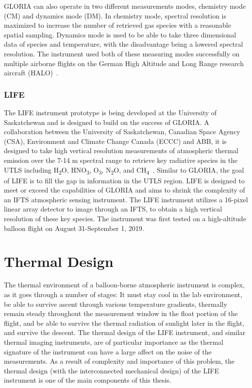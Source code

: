 GLORIA can also operate in two different measurements modes, chemistry mode (CM) and dynamics mode (DM). In chemistry mode, spectral resolution is maximized to increase the number of retrieved gas species with a reasonable spatial sampling. Dynamics mode is used to be able to take three dimensional data of species and temperature, with the disadvantage being a lowered spectral resolution. The instrument used both of these measuring modes successfully on multiple airborne flights on the German High Altitude and Long Range research aircraft (HALO)~\citep{GLORIA_concept}. 

\subsubsection{LIFE} %
The LIFE instrument prototype is being developed at the University of Saskatchewan and is designed to build on the success of GLORIA.  A collaboration between the University of Saskatchewan, Canadian Space Agency (CSA), Environment and Climate Change Canada (ECCC) and ABB, it is designed to take high vertical resolution measurements of atmospheric thermal emission over the 7-14 \textmu m spectral range to retrieve key radiative species in the UTLS including H\textsubscript{2}O, HNO\textsubscript{3}, O\textsubscript{3}, N\textsubscript{2}O, and CH\textsubscript{4}~\citep{ethans_thesis}. Similar to GLORIA, the goal of LIFE is to fill the gap in information in the UTLS region. LIFE is designed to meet or exceed the capabilities of GLORIA and aims to shrink the complexity of an IFTS atmospheric sensing instrument. The LIFE instrument utilizes a 16-pixel linear array detector to image through an IFTS, to obtain a high vertical resolution of these key species. The instrument was first tested on a high-altitude balloon flight on August 31-September 1, 2019.

\section{Thermal Design}
The thermal environment of a balloon-borne atmospheric instrument is complex, as it goes through a number of stages: It must stay cool in the lab environment, be able to survive ascent through various temperature gradients, thermally remain steady throughout the measurement window in the float portion of the flight, and be able to survive the thermal radiation of sunlight later in the flight, and survive the descent. The thermal design of the LIFE instrument, and similar thermal imaging instruments, are of particular importance as the thermal signature of the instrument can have a large affect on the noise of the measurements. As a result of complexity and importance of this problem, the thermal design (with the interconnected mechanical design) of the LIFE instrument is one of the main components of this thesis. 


